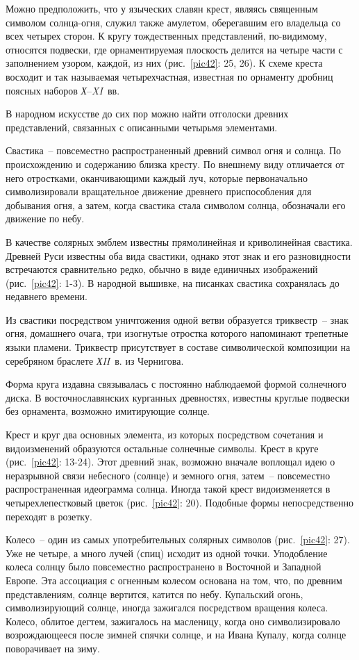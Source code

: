 \documentclass[pscyr,chapters]{hedwork}
\begin{document}
  Можно предположить, что у языческих славян крест, являясь священным символом
  солнца-огня, служил также амулетом, оберегавшим его владельца со всех четырех
  сторон. К кругу тождественных представлений, по-видимому, относятся подвески,
  где орнаментируемая плоскость делится на четыре части с заполнением узором,
  каждой, из них (рис.~\ref{pic42}: 25, 26). К схеме креста восходит и так
  называемая четырехчастная, известная по орнаменту дробниц поясных наборов
  \emph{Х}--\emph{XI}~вв.

  В народном искусстве до сих пор можно найти отголоски древних представлений,
  связанных с описанными четырьмя элементами.

  Свастика~-- повсеместно распространенный древний символ огня и солнца. По
  происхождению и содержанию близка кресту. По внешнему виду отличается от него
  отростками, оканчивающими каждый луч, которые первоначально символизировали
  вращательное движение древнего приспособления для добывания огня, а затем,
  когда свастика стала символом солнца, обозначали его движение по небу.

  В качестве солярных эмблем известны прямолинейная и криволинейная свастика.
  Древней Руси известны оба вида свастики, однако этот знак и его разновидности
  встречаются сравнительно редко, обычно в виде единичных изображений
  (рис.~\ref{pic42}: 1-3). В народной вышивке, на писанках свастика сохранялась
  до недавнего времени.

  Из свастики посредством уничтожения одной ветви образуется триквестр~-- знак
  огня, домашнего очага, три изогнутые отростка которого напоминают трепетные
  языки пламени. Триквестр присутствует в составе символической композиции на
  серебряном браслете \emph{ХII}~в. из Чернигова.

  Форма круга издавна связывалась с постоянно наблюдаемой формой солнечного
  диска. В восточнославянских курганных древностях, известны круглые подвески
  без орнамента, возможно имитирующие солнце.

  Крест и круг два основных элемента, из которых посредством сочетания и
  видоизменений образуются остальные солнечные символы. Крест в круге
  (рис.~\ref{pic42}: 13-24). Этот древний знак, возможно вначале воплощал идею о
  неразрывной связи небесного (солнце) и земного огня, затем~-- повсеместно
  распространенная идеограмма солнца. Иногда такой крест видоизменяется в
  четырехлепестковый цветок (рис.~\ref{pic42}: 20). Подобные формы
  непосредственно переходят в розетку.

  Колесо~-- один из самых употребительных солярных символов (рис.~\ref{pic42}: 27).
  Уже не четыре, а много лучей (спиц) исходит из одной точки. Уподобление колеса
  солнцу было повсеместно распространено в Восточной и Западной Европе. Эта
  ассоциация с огненным колесом основана на том, что, по древним представлениям,
  солнце вертится, катится по небу.
  Купальский огонь, символизирующий солнце, иногда зажигался посредством
  вращения колеса. Колесо, облитое дегтем, зажигалось на масленицу, когда оно
  символизировало возрождающееся после зимней спячки солнце, и на Ивана Купалу,
  когда солнце поворачивает на зиму.
  
\end{document}
